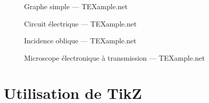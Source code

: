 \begin{frame}
  \begin{figure}
    \centering
    \tikzexc
    \caption{\footnotesize Graphe simple --- TEXample.net \cite{tikzandpgfexamples}}
  \end{figure}
\end{frame}

\begin{frame}
  \begin{figure}
    \centering
    \scalebox{0.7}{\tikzexe}
    \caption{\footnotesize Circuit électrique --- TEXample.net \cite{tikzandpgfexamples}}
  \end{figure}
\end{frame}

\begin{frame}
  \begin{figure}
    \centering
    \scalebox{0.7}{\tikzexd}
    \caption{\footnotesize Incidence oblique --- TEXample.net \cite{tikzandpgfexamples}}
  \end{figure}
\end{frame}

\begin{frame}
  \begin{figure}
    \centering
    \scalebox{0.7}{\tikzexb}
    \caption{\footnotesize Microscope électronique à transmission --- TEXample.net \cite{tikzandpgfexamples}}
  \end{figure}
\end{frame}



\section{Utilisation de TikZ}

